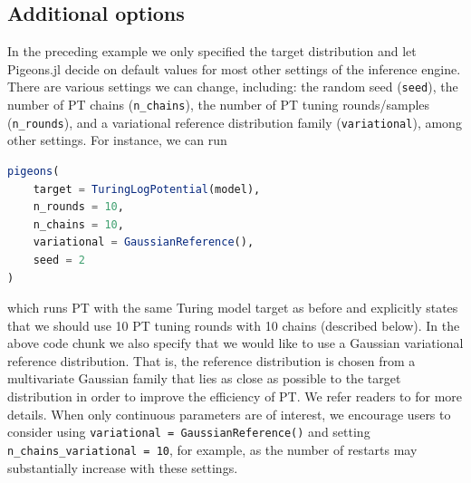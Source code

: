 \subsection{Additional options}
\label{sec:additional_options}
In the preceding example we only specified the target distribution and let 
Pigeons.jl decide on default values for most other settings of the inference engine. 
There are various settings we can change, including: 
the random seed (\texttt{seed}), the number of PT chains (\texttt{n\_chains}), 
the number of PT tuning rounds/samples (\texttt{n\_rounds}), 
and a variational reference distribution family (\texttt{variational}), among other settings.
For instance, we can run 
\begin{lstlisting}[language = Julia]
pigeons(
    target = TuringLogPotential(model),
    n_rounds = 10, 
    n_chains = 10,
    variational = GaussianReference(),
    seed = 2
)
\end{lstlisting}
which runs PT with the same Turing model target as before and explicitly states 
that we should use 10 PT tuning rounds with 10 chains (described below). 
In the above code chunk we also specify that we would like to use a 
Gaussian variational reference distribution.
That is, the reference distribution is chosen from a multivariate Gaussian family 
that lies as close as possible to the target distribution in order to improve 
the efficiency of PT. We refer readers to \citet{surjanovic2022vpt} for more details.
When only continuous parameters are of interest, we encourage users to consider 
using \texttt{variational = GaussianReference()} and setting \texttt{n\_chains\_variational = 10}, 
for example, as the number of restarts may substantially increase with these settings.

